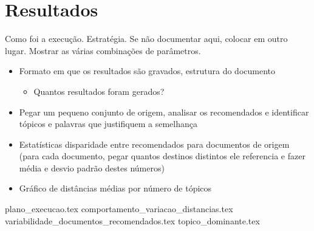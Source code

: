 \section{Resultados}

Como foi a execução. Estratégia. Se não documentar aqui, colocar em outro lugar.
Mostrar as várias combinações de parâmetros.

\begin{itemize}
    \item Formato em que os resultados são gravados, estrutura do documento
    \begin{itemize}
        \item Quantos resultados foram gerados?
    \end{itemize}
    \item Pegar um pequeno conjunto de origem, analisar os recomendados e identificar tópicos e palavras que justifiquem a semelhança
    \item Estatísticas disparidade entre recomendados para documentos de origem (para cada documento, pegar quantos destinos distintos ele 
    referencia e fazer média e desvio padrão destes números)
    \item Gráfico de distâncias médias por número de tópicos
\end{itemize}

{plano_execucao.tex}
{comportamento_variacao_distancias.tex}
{variabilidade_documentos_recomendados.tex}
{topico_dominante.tex}    
